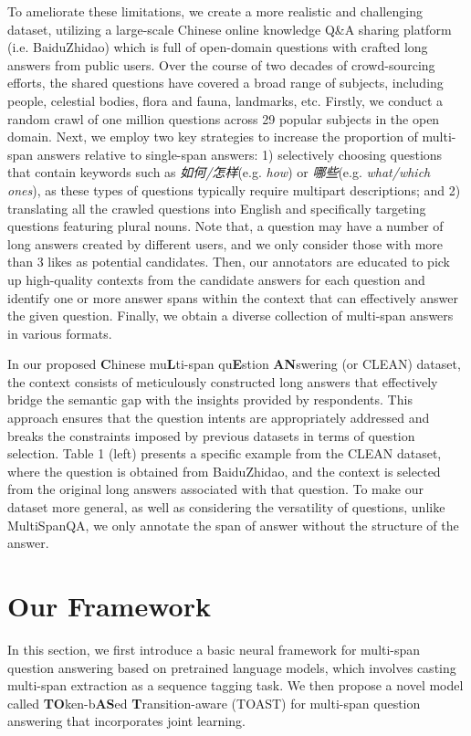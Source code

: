 \documentclass[a4paper]{cas-sc}
\newcommand{\1}[1]{\mathds{1}\left[#1\right]}
\begin{document}
To ameliorate these limitations, we create a more realistic and challenging dataset, utilizing a large-scale Chinese online knowledge Q\&A sharing platform (i.e. BaiduZhidao) which is full of open-domain questions with crafted long answers from  public users. 
Over the course of two decades of crowd-sourcing efforts, the shared questions have covered  a broad range of subjects, including people, celestial bodies, flora and fauna, landmarks, etc. Firstly, we conduct a random crawl of one million questions across 29 popular subjects in the open domain. Next, we employ two key strategies to increase the proportion of multi-span answers relative to single-span answers: 1) selectively choosing questions that contain  keywords such as \emph{如何/怎样}(e.g. \emph{how}) or \emph{哪些}(e.g.\emph{ what/which ones}), as these types of questions typically require multipart descriptions; and 2) translating all the crawled questions into English and specifically targeting questions featuring plural nouns. 
Note that, a question may have a number of long answers created by different users, and we only consider those with more than 3 likes as potential candidates. Then, our annotators are educated to pick up high-quality contexts from the candidate answers for each question and identify one or more answer spans within the context that can effectively answer the given question. Finally, we obtain a diverse collection of multi-span answers in various formats.

In our proposed \textbf{C}hinese mu\textbf{L}ti-span qu\textbf{E}stion \textbf{AN}swering (or CLEAN) dataset, the context consists of meticulously constructed long answers that effectively bridge the semantic gap with the insights provided by respondents. This approach ensures that the question intents are appropriately addressed and breaks the constraints imposed by  previous datasets in terms of question selection. 
Table 1 (left) presents a specific example from the CLEAN dataset, where the question is obtained from BaiduZhidao, and the context is selected from the original long answers associated with that question. 
To make our dataset more general, as well as considering the versatility of questions, unlike MultiSpanQA, we only annotate the span of answer without the structure of the answer.

\section{Our Framework}
\label{sec:framework}
In this section, we first introduce a basic neural framework for multi-span question answering based on pretrained language models, which involves casting multi-span extraction as a sequence tagging task. We then propose a novel model called \textbf{TO}ken-b\textbf{AS}ed \textbf{T}ransition-aware 
(TOAST) for multi-span question answering that incorporates joint learning.
\end{document}
